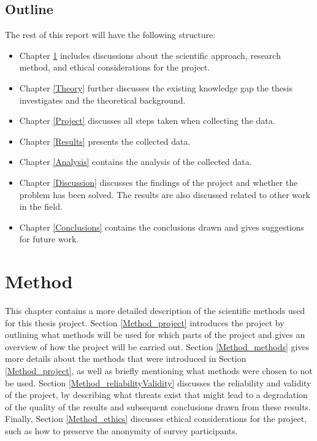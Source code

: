 \documentclass[a4paper,12pt]{article}
\begin{document}
\subsection{Outline}
\label{Intro_outlin}
The rest of this report will have the following structure:
\begin{itemize}
    \item Chapter \ref{Method} includes discussions about the scientific approach, research method, and ethical considerations for the project.
    \item Chapter \ref{Theory} further discusses the existing knowledge gap the thesis investigates and the theoretical background.
    \item Chapter \ref{Project} discusses all steps taken when collecting the data.
    \item Chapter \ref{Results} presents the collected data.
    \item Chapter \ref{Analysis} contains the analysis of the collected data.
    \item Chapter \ref{Discussion} discusses the findings of the project and whether the problem has been solved. The results are also discussed related to other work in the field.
    \item Chapter \ref{Conclusions} contains the conclusions drawn and gives suggestions for future work.
\end{itemize}

\newpage

\section{Method}
\label{Method}
This chapter contains a more detailed description of the scientific methods used for this thesis project. Section \ref{Method_project} introduces the project by outlining what methods will be used for which parts of the project and gives an overview of how the project will be carried out. Section \ref{Method_methods} gives more details about the methods that were introduced in Section \ref{Method_project}, as well as briefly mentioning what methods were chosen to not be used. Section \ref{Method_reliabilityValidity} discusses the reliability and validity of the project, by describing what threats exist that might lead to a degradation of the quality of the results and subsequent conclusions drawn from these results. Finally, Section \ref{Method_ethics} discusses ethical considerations for the project, such as how to preserve the anonymity of survey participants.
\end{document}
